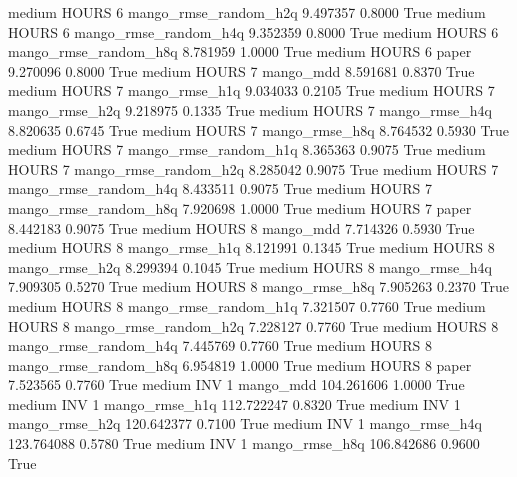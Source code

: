     medium    HOURS                 6 mango_rmse_random_h2q   9.497357      0.8000    True
    medium    HOURS                 6 mango_rmse_random_h4q   9.352359      0.8000    True
    medium    HOURS                 6 mango_rmse_random_h8q   8.781959      1.0000    True
    medium    HOURS                 6                 paper   9.270096      0.8000    True
    medium    HOURS                 7             mango_mdd   8.591681      0.8370    True
    medium    HOURS                 7        mango_rmse_h1q   9.034033      0.2105    True
    medium    HOURS                 7        mango_rmse_h2q   9.218975      0.1335    True
    medium    HOURS                 7        mango_rmse_h4q   8.820635      0.6745    True
    medium    HOURS                 7        mango_rmse_h8q   8.764532      0.5930    True
    medium    HOURS                 7 mango_rmse_random_h1q   8.365363      0.9075    True
    medium    HOURS                 7 mango_rmse_random_h2q   8.285042      0.9075    True
    medium    HOURS                 7 mango_rmse_random_h4q   8.433511      0.9075    True
    medium    HOURS                 7 mango_rmse_random_h8q   7.920698      1.0000    True
    medium    HOURS                 7                 paper   8.442183      0.9075    True
    medium    HOURS                 8             mango_mdd   7.714326      0.5930    True
    medium    HOURS                 8        mango_rmse_h1q   8.121991      0.1345    True
    medium    HOURS                 8        mango_rmse_h2q   8.299394      0.1045    True
    medium    HOURS                 8        mango_rmse_h4q   7.909305      0.5270    True
    medium    HOURS                 8        mango_rmse_h8q   7.905263      0.2370    True
    medium    HOURS                 8 mango_rmse_random_h1q   7.321507      0.7760    True
    medium    HOURS                 8 mango_rmse_random_h2q   7.228127      0.7760    True
    medium    HOURS                 8 mango_rmse_random_h4q   7.445769      0.7760    True
    medium    HOURS                 8 mango_rmse_random_h8q   6.954819      1.0000    True
    medium    HOURS                 8                 paper   7.523565      0.7760    True
    medium      INV                 1             mango_mdd 104.261606      1.0000    True
    medium      INV                 1        mango_rmse_h1q 112.722247      0.8320    True
    medium      INV                 1        mango_rmse_h2q 120.642377      0.7100    True
    medium      INV                 1        mango_rmse_h4q 123.764088      0.5780    True
    medium      INV                 1        mango_rmse_h8q 106.842686      0.9600    True
